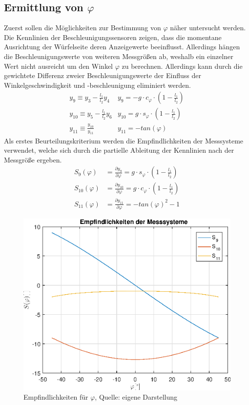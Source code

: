 \subsection{Ermittlung von $\varphi$}
Zuerst sollen die Möglichkeiten zur Bestimmung von $\varphi$ näher untersucht werden. Die Kennlinien der Beschleunigungssensoren zeigen, dass die momentane Ausrichtung der Würfelseite deren Anzeigewerte beeinflusst. Allerdings hängen die Beschleunigungswerte von weiteren Messgrößen ab, weshalb ein einzelner Wert nicht ausreicht um den Winkel $\varphi$ zu berechnen. Allerdings kann durch die gewichtete Differenz zweier Beschleunigungswerte der Einfluss der Winkelgeschwindigkeit und -beschleunigung eliminiert werden.
\begin{equation}
\begin{split}
y_9 \equiv y_3 - \frac{l_1}{l_2}y_4 &y_9 = -g\cdot c_{\varphi}\cdot (1-\frac{l_1}{l_2}) \\
y_{10} \equiv y_5 - \frac{l_1}{l_2}y_6 &y_{10} = g\cdot s_{\varphi}\cdot(1-\frac{l_1}{l_2}) \\
y_{11}\equiv \frac{y_{10}}{y_{11}} &y_{11} = -tan(\varphi)
\end{split}
\end{equation}
Als erstes Beurteilungskriterium werden die Empfindlichkeiten der Messsysteme verwendet, welche sich durch die partielle Ableitung der Kennlinien nach der Messgröße ergeben.
\begin{equation}
\begin{split}
S_9(\varphi) &= \frac{\partial y_9}{\partial \varphi} = g\cdot s_{\varphi}\cdot (1 - \frac{l_1}{l_2}) \\
S_{10}(\varphi) &= \frac{\partial y_{10}}{\partial \varphi} = g \cdot c_{\varphi} \cdot (1- \frac{l_1}{l_2}) \\
S_{11}(\varphi) &= \frac{\partial y_{11}}{\partial \varphi} = -tan(\varphi)^2 - 1
\end{split}
\end{equation}
\begin{figure}[h!]
\centering
\includegraphics[width=0.5\linewidth]{3_Sensorik/img/empfindlichkeit_phi}
\caption{Empfindlichkeiten für $\varphi$, Quelle: eigene Darstellung}
\end{figure}
